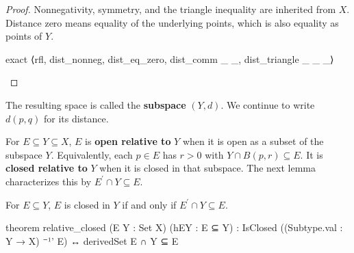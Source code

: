 \begin{proof}
  Nonnegativity, symmetry, and the triangle inequality are inherited from $X$.
  Distance zero means equality of the underlying points, which is also equality as points of $Y$.

  \begin{lean}
    exact ⟨rfl, dist_nonneg, dist_eq_zero, dist_comm _ _, dist_triangle _ _ _⟩
  \end{lean}

\end{proof}

The resulting space is called the \textbf{subspace} $(Y,d)$.
We continue to write $d(p,q)$ for its distance.

\begin{definition}
  \label{ma:def:relative-open-closed-sets}
  For $E\subseteq Y\subseteq X$, $E$ is \textbf{open relative to} $Y$ when it is open as a subset
  of the subspace $Y$.
  Equivalently, each $p\in E$ has $r>0$ with $Y\cap B(p,r)\subseteq E$.
  It is \textbf{closed relative to} $Y$ when it is closed in that subspace.
  The next lemma characterizes this by $E^{\prime}\cap Y\subseteq E$.
\end{definition}

\begin{lemma}
  \label{ma:lem:relative-closed}
  For $E\subseteq Y$, $E$ is closed in $Y$ if and only if $E^{\prime}\cap Y\subseteq E$.

  \begin{lean}
    theorem relative_closed (E Y : Set X) (hEY : E ⊆ Y) :
        IsClosed ((Subtype.val : Y → X) ⁻¹' E) ↔ derivedSet E ∩ Y ⊆ E
  \end{lean}
\end{lemma}

